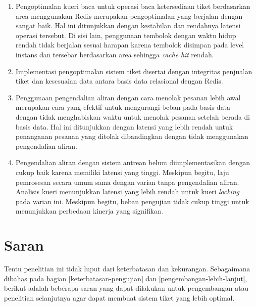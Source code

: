 \begin{enumerate}
    \item Pengoptimalan kueri baca untuk operasi baca ketersediaan tiket berdasarkan area menggunakan Redis merupakan pengoptimalan yang berjalan dengan sangat baik. Hal ini ditunjukkan dengan kestabilan dan rendahnya latensi operasi tersebut. Di sisi lain, penggunaan tembolok dengan waktu hidup rendah tidak berjalan sesuai harapan karena tembolok disimpan pada level instans dan tersebar berdasarkan area sehingga \textit{cache hit} rendah.
    \item Implementasi pengoptimalan sistem tiket disertai dengan integritas penjualan tiket dan kesesuaian data antara basis data relasional dengan Redis.
    \item Penggunaan pengendalian aliran dengan cara menolak pesanan lebih awal merupakan cara yang efektif untuk mengurangi beban pada basis data dengan tidak menghabiskan waktu untuk menolak pesanan setelah berada di basis data. Hal ini ditunjukkan dengan latensi yang lebih rendah untuk penanganan pesanan yang ditolak dibandingkan dengan tidak menggunakan pengendalian aliran.
    \item Pengendalian aliran dengan sistem antrean belum diimplementasikan dengan cukup baik karena memiliki latensi yang tinggi. Meskipun begitu, laju pemrosesan secara umum sama dengan varian tanpa pengendalian aliran. Analisis kueri menunjukkan latensi yang lebih rendah untuk kueri \textit{locking} pada varian ini. Meskipun begitu, beban pengujian tidak cukup tinggi untuk menunjukkan perbedaan kinerja yang signifikan.
\end{enumerate}

\pagebreak

\section{Saran}

Tentu penelitian ini tidak luput dari keterbatasan dan kekurangan. Sebagaimana dibahas pada bagian \ref{keterbatasan-pengujian} dan \ref{pengembangan-lebih-lanjut}, berikut adalah beberapa saran yang dapat dilakukan untuk pengembangan atau penelitian selanjutnya agar dapat membuat sistem tiket yang lebih optimal.

